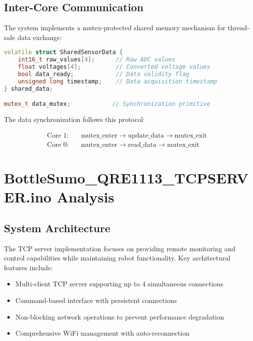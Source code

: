 \documentclass[12pt,a4paper]{article}
\begin{document}
\subsection{Inter-Core Communication}

The system implements a mutex-protected shared memory mechanism for thread-safe data exchange:

\begin{lstlisting}[language=C++, caption=Shared Data Structure]
volatile struct SharedSensorData {
    int16_t raw_values[4];      // Raw ADC values
    float voltages[4];          // Converted voltage values
    bool data_ready;            // Data validity flag
    unsigned long timestamp;    // Data acquisition timestamp
} shared_data;

mutex_t data_mutex;            // Synchronization primitive
\end{lstlisting}

The data synchronization follows this protocol:

\begin{equation}
\begin{aligned}
\text{Core 1:} & \quad \text{mutex\_enter} \rightarrow \text{update\_data} \rightarrow \text{mutex\_exit} \\
\text{Core 0:} & \quad \text{mutex\_enter} \rightarrow \text{read\_data} \rightarrow \text{mutex\_exit}
\end{aligned}
\end{equation}

\section{BottleSumo\_QRE1113\_TCPSERVER.ino Analysis}

\subsection{System Architecture}

The TCP server implementation focuses on providing remote monitoring and control capabilities while maintaining robot functionality. Key architectural features include:

\begin{itemize}
    \item Multi-client TCP server supporting up to 4 simultaneous connections
    \item Command-based interface with persistent connections
    \item Non-blocking network operations to prevent performance degradation
    \item Comprehensive WiFi management with auto-reconnection
\end{itemize}
\end{document}
